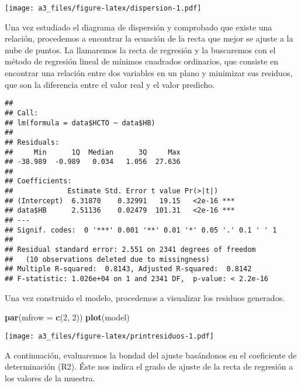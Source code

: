 \documentclass[]{article}
\newenvironment{Shaded}{\begin{snugshade}}{\end{snugshade}}
\newcommand{\DataTypeTok}[1]{\textcolor[rgb]{0.13,0.29,0.53}{#1}}
\newcommand{\DecValTok}[1]{\textcolor[rgb]{0.00,0.00,0.81}{#1}}
\newcommand{\KeywordTok}[1]{\textcolor[rgb]{0.13,0.29,0.53}{\textbf{#1}}}
\newcommand{\NormalTok}[1]{#1}
\newcommand{\OperatorTok}[1]{\textcolor[rgb]{0.81,0.36,0.00}{\textbf{#1}}}
\newcommand{\StringTok}[1]{\textcolor[rgb]{0.31,0.60,0.02}{#1}}
\begin{document}
\texttt{[image: a3\_files/figure-latex/dispersion-1.pdf]}

Una vez estudiado el diagrama de dispersión y comprobado que existe una
relación, procedemos a encontrar la ecuación de la recta que mejor se
ajuste a la nube de puntos. La llamaremos la recta de regresión y la
buscaremos con el método de regresión lineal de mínimos cuadrados
ordinarios, que consiste en encontrar una relación entre dos variables
en un plano y minimizar sus residuos, que son la diferencia entre el
valor real y el valor predicho.

\begin{Shaded}
\end{Shaded}

\begin{verbatim}
## 
## Call:
## lm(formula = data$HCTO ~ data$HB)
## 
## Residuals:
##     Min      1Q  Median      3Q     Max 
## -38.989  -0.989   0.034   1.056  27.636 
## 
## Coefficients:
##             Estimate Std. Error t value Pr(>|t|)    
## (Intercept)  6.31870    0.32991   19.15   <2e-16 ***
## data$HB      2.51136    0.02479  101.31   <2e-16 ***
## ---
## Signif. codes:  0 '***' 0.001 '**' 0.01 '*' 0.05 '.' 0.1 ' ' 1
## 
## Residual standard error: 2.551 on 2341 degrees of freedom
##   (10 observations deleted due to missingness)
## Multiple R-squared:  0.8143, Adjusted R-squared:  0.8142 
## F-statistic: 1.026e+04 on 1 and 2341 DF,  p-value: < 2.2e-16
\end{verbatim}

Una vez construido el modelo, procedemos a visualizar los residuos
generados.

\begin{Shaded}
\begin{Highlighting}[]
\KeywordTok{par}\NormalTok{(}\DataTypeTok{mfrow =} \KeywordTok{c}\NormalTok{(}\DecValTok{2}\NormalTok{, }\DecValTok{2}\NormalTok{))}
\KeywordTok{plot}\NormalTok{(model)}
\end{Highlighting}
\end{Shaded}

\texttt{[image: a3\_files/figure-latex/printresiduos-1.pdf]}

A continuación, evaluaremos la bondad del ajuste basándonos en el
coeficiente de determinación (R2). Éste nos indica el grado de ajuste de
la recta de regresión a los valores de la muestra.
\end{document}
